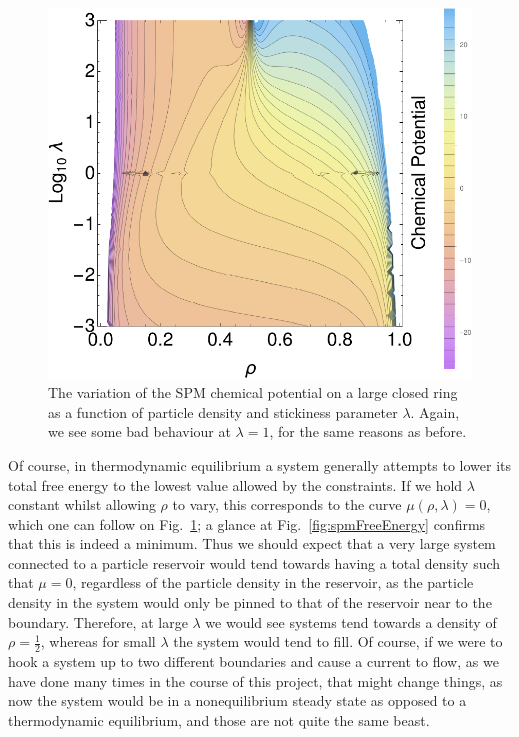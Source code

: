 \begin{figure}[h!]
 \caption[The chemical potential of the SPM on a closed ring, as a function of density
 and $\lambda$.]{\label{fig:spmChemPot} 
 The variation of the SPM chemical potential on a large closed ring as a function of particle 
 density and stickiness parameter $\lambda$. Again, we see some bad behaviour at $\lambda=1$,
 for the same reasons as before.
 }
  \begin{center}
 \includegraphics[width=1.0\textwidth]{analytics/images/spmChemPot}
  \end{center}
\end{figure}
Of course, in thermodynamic equilibrium a system generally attempts to lower its total free energy
to the lowest value allowed by the constraints. If we hold $\lambda$ constant whilst allowing $\rho$
to vary, this corresponds to the curve $\mu(\rho, \lambda)=0$, which one can follow on
Fig.~\ref{fig:spmChemPot}; a glance at Fig.~\ref{fig:spmFreeEnergy} confirms that this is indeed
a minimum. Thus we should expect that a very large system connected to a particle reservoir would
tend towards having a total density such that $\mu = 0$, regardless of the particle density
in the reservoir, as the particle density in the system would only be pinned to that of the
reservoir near to the boundary. Therefore, at large $\lambda$ we would see systems tend towards a
density of $\rho=\frac{1}{2}$, whereas for small $\lambda$ the system would tend to fill.
Of course, if we were to hook a system up to two different boundaries and cause a current to flow,
as we have done many times in the course of this project,
that might change things, as now the system would be in a nonequilibrium steady state as opposed
to a thermodynamic equilibrium, and those are not quite the same beast.

